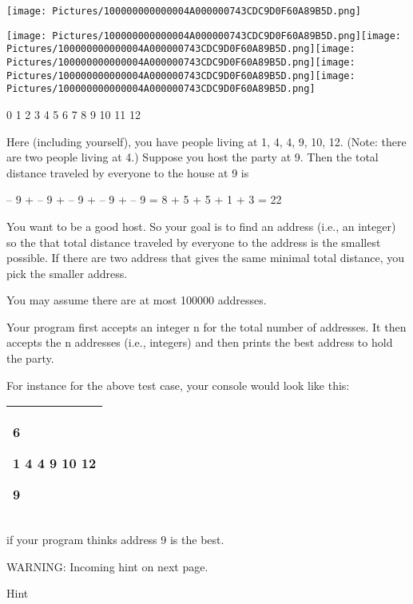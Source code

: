 \documentclass[
]{article}
\begin{document}
\texttt{[image: Pictures/100000000000004A000000743CDC9D0F60A89B5D.png]}

\texttt{[image: Pictures/100000000000004A000000743CDC9D0F60A89B5D.png]}\texttt{[image: Pictures/100000000000004A000000743CDC9D0F60A89B5D.png]}\texttt{[image: Pictures/100000000000004A000000743CDC9D0F60A89B5D.png]}\texttt{[image: Pictures/100000000000004A000000743CDC9D0F60A89B5D.png]}\texttt{[image: Pictures/100000000000004A000000743CDC9D0F60A89B5D.png]}

0 1 2 3 4 5 6 7 8 9 10 11 12

Here (including yourself), you have people living at 1, 4, 4, 9, 10, 12.
(Note: there are two people living at 4.) Suppose you host the party at
9. Then the total distance traveled by everyone to the house at 9 is

 -- 9\textbar{} +  -- 9\textbar{} +  --
9\textbar{} +  -- 9\textbar{} +  -- 9\textbar{} = 8
+ 5 + 5 + 1 + 3 = 22

You want to be a good host. So your goal is to find an address (i.e., an
integer) so the that total distance traveled by everyone to the address
is the smallest possible. If there are two address that gives the same
minimal total distance, you pick the smaller address.

You may assume there are at most 100000 addresses.

Your program first accepts an integer n for the total number of
addresses. It then accepts the n addresses (i.e., integers) and then
prints the best address to hold the party.

For instance for the above test case, your console would look like this:

\begin{longtable}[]{@{}l@{}}
\toprule
\endhead
\begin{minipage}[t]{0.97\columnwidth}\raggedright
6

1 4 4 9 10 12

9\strut
\end{minipage}\tabularnewline
\bottomrule
\end{longtable}

if your program thinks address 9 is the best.

WARNING: Incoming hint on next page.

Hint
\end{document}
